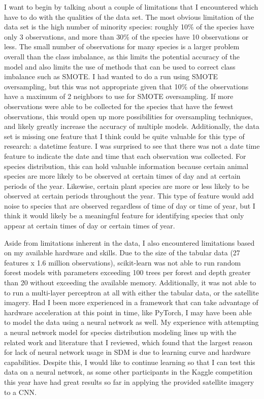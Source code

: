 \documentclass[12pt, oneside]{article}
\begin{document}
\begin{normalsize}
I want to begin by talking about a couple of limitations that I encountered which have to do with the qualities of the data set. The most obvious limitation of the data set is the high number of minority species: roughly 10\% of the species have only 3 observations, and more than 30\% of the species have 10 observations or less. The small number of observations for many species is a larger problem overall than the class imbalance, as this limits the potential accuracy of the model and also limits the use of methods that can be used to correct class imbalance such as SMOTE. I had wanted to do a run using SMOTE oversampling, but this was not appropriate given that 10\% of the observations have a maximum of 2 neighbors to use for SMOTE oversampling. If more observations were able to be collected for the species that have the fewest observations, this would open up more possibilities for oversampling techniques, and likely greatly increase the accuracy of multiple models. Additionally, the data set is missing one feature that I think could be quite valuable for this type of research: a datetime feature. I was surprised to see that there was not a date time feature to indicate the date and time that each observation was collected. For species distribution, this can hold valuable information because certain animal species are more likely to be observed at certain times of day and at certain periods of the year. Likewise, certain plant species are more or less likely to be observed at certain periods throughout the year. This type of feature would add noise to species that are observed regardless of time of day or time of year, but I think it would likely be a meaningful feature for identifying species that only appear at certain times of day or certain times of year.

Aside from limitations inherent in the data, I also encountered limitations based on my available hardware and skills. Due to the size of the tabular data (27 features x 1.6 million observations), scikit-learn was not able to run random forest models with parameters exceeding 100 trees per forest and depth greater than 20 without exceeding the available memory. Additionally, it was not able to to run a multi-layer perceptron at all with either the tabular data, or the satellite imagery. Had I been more experienced in a framework that can take advantage of hardware acceleration at this point in time, like PyTorch, I may have been able to model the data using a neural network as well. My experience with attempting a neural network model for species distribution modeling lines up with the related work and literature that I reviewed, which found that the largest reason for lack of neural network usage in SDM is due to learning curve and hardware capabilities. Despite this, I would like to continue learning so that I can test this data on a neural network, as some other participants in the Kaggle competition this year have had great results so far in applying the provided satellite imagery to a CNN.

\end{normalsize}
\end{document}
